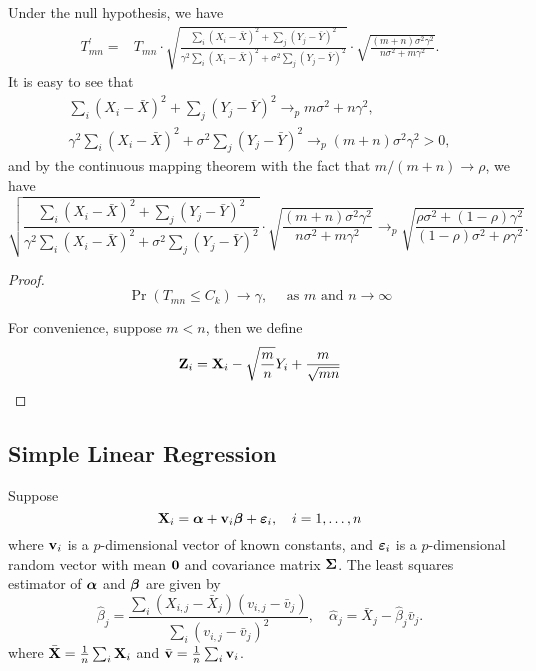 Under the null hypothesis, we have
\begin{equation*}
	\begin{aligned}
		T_{mn}^{\prime}= & T_{mn}\cdot\sqrt{\frac{\sum_{i}\left(X_i-\bar{X}\right)^2+\sum_{j}\left(Y_j-\bar{Y}\right)^2}{\gamma^{2}\sum_{i}\left(X_i-\bar{X}\right)^2+\sigma^{2}\sum_{j}\left(Y_j-\bar{Y}\right)^2}}\cdot\sqrt{\frac{(m+n)\sigma^{2}\gamma^{2}}{n\sigma^{2}+m\gamma^{2}}}.
	\end{aligned}
\end{equation*}
It is easy to see that
\begin{gather*}
	\sum_{i}\left(X_i-\bar{X}\right)^2+\sum_{j}\left(Y_j-\bar{Y}\right)^2\rightarrow_{p} m\sigma^{2}+n\gamma^{2},\\
	\gamma^{2}\sum_{i}\left(X_i-\bar{X}\right)^2+\sigma^{2}\sum_{j}\left(Y_j-\bar{Y}\right)^2\rightarrow_{p} (m+n)\sigma^{2}\gamma^{2}>0,
\end{gather*}
and by the continuous mapping theorem with the fact that $m/(m+n)\rightarrow\rho$, we have
\begin{equation*}
	\sqrt{\frac{\sum_{i}\left(X_i-\bar{X}\right)^2+\sum_{j}\left(Y_j-\bar{Y}\right)^2}{\gamma^{2}\sum_{i}\left(X_i-\bar{X}\right)^2+\sigma^{2}\sum_{j}\left(Y_j-\bar{Y}\right)^2}}\cdot\sqrt{\frac{(m+n)\sigma^{2}\gamma^{2}}{n\sigma^{2}+m\gamma^{2}}}\rightarrow_{p}\sqrt{\frac{\rho\sigma^{2}+(1-\rho)\gamma^{2}}{(1-\rho)\sigma^{2}+\rho\gamma^{2}}}.
\end{equation*}

\begin{proof}
	\begin{equation*}
		\Pr\left(T_{mn}\leq C_{k}\right)\rightarrow\gamma,\quad\text{ as }m\text{ and }n\rightarrow\infty
	\end{equation*}

	For convenience, suppose $m<n$, then we define
	\begin{equation*}
		{\bf Z}_{i}={\bf X}_{i}-\sqrt{\frac{m}{n}}Y_{i}+\frac{m}{\sqrt{mn}}
	\end{equation*}
\end{proof}

\subsection{Simple Linear Regression}

Suppose
\begin{equation*}
	{\bf X}_{i}=\boldsymbol{\alpha}+{\bf v}_{i}\boldsymbol{\beta}+\boldsymbol{\varepsilon}_{i},\quad i=1,\ldots,n
\end{equation*}
where ${\bf v}_{i}$ is a $p$-dimensional vector of known constants, and $\boldsymbol{\varepsilon}_{i}$ is a $p$-dimensional random vector with mean $\mathbf{0}$ and covariance matrix $\boldsymbol{\Sigma}$. The least squares estimator of $\boldsymbol{\alpha}$ and $\boldsymbol{\beta}$ are given by
\begin{equation*}
	\hat{\beta}_{j}=\frac{\sum_{i}(X_{i,j}-\bar{X}_{j})(v_{i,j}-\bar{v}_{j})}{\sum_{i}(v_{i,j}-\bar{v}_{j})^{2}},\quad\hat{\alpha}_{j}=\bar{X}_{j}-\hat{\beta}_{j}\bar{v}_{j}.
\end{equation*}
where $\bar{{\bf X}}=\frac{1}{n}\sum_{i}{\bf X}_{i}$ and $\bar{{\bf v}}=\frac{1}{n}\sum_{i}{\bf v}_{i}$.

